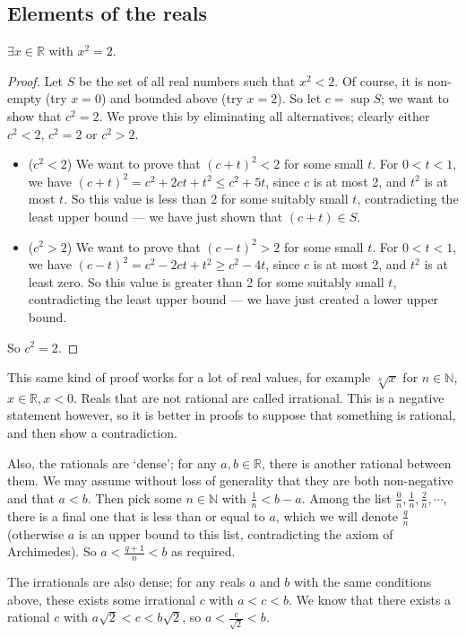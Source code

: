 \subsection{Elements of the reals}
\begin{theorem}
	\(\exists x \in \mathbb R\) with \(x^2 = 2\).
\end{theorem}
\begin{proof}
	Let \(S\) be the set of all real numbers such that \(x^2 < 2\).
	Of course, it is non-empty (try \(x=0\)) and bounded above (try \(x=2\)).
	So let \(c = \sup S\); we want to show that \(c^2 = 2\).
	We prove this by eliminating all alternatives; clearly either \(c^2 < 2\), \(c^2 = 2\) or \(c^2 > 2\).
	\begin{itemize}
		\item (\(c^2 < 2\)) We want to prove that \((c+t)^2 < 2\) for some small \(t\).
		      For \(0<t<1\), we have \((c+t)^2 = c^2 + 2ct + t^2 \leq c^2 + 5t\), since \(c\) is at most 2, and \(t^2\) is at most \(t\).
		      So this value is less than 2 for some suitably small \(t\), contradicting the least upper bound --- we have just shown that \((c+t) \in S\).
		\item (\(c^2 > 2\)) We want to prove that \((c-t)^2 > 2\) for some small \(t\).
		      For \(0<t<1\), we have \((c-t)^2 = c^2 - 2ct + t^2 \geq c^2 - 4t\), since \(c\) is at most 2, and \(t^2\) is at least zero.
		      So this value is greater than 2 for some suitably small \(t\), contradicting the least upper bound --- we have just created a lower upper bound.
	\end{itemize}
	So \(c^2 = 2\).
\end{proof}
This same kind of proof works for a lot of real values, for example \(\sqrt[n]{x}\) for \(n \in \mathbb N\), \(x\in \mathbb R, x < 0\).
Reals that are not rational are called irrational.
This is a negative statement however, so it is better in proofs to suppose that something is rational, and then show a contradiction.

Also, the rationals are `dense'; for any \(a, b \in \mathbb R\), there is another rational between them.
We may assume without loss of generality that they are both non-negative and that \(a<b\).
Then pick some \(n \in \mathbb N\) with \(\frac{1}{n} < b-a\).
Among the list \(\frac{0}{n}, \frac{1}{n}, \frac{2}{n}, \cdots\), there is a final one that is less than or equal to \(a\), which we will denote \(\frac{q}{n}\) (otherwise \(a\) is an upper bound to this list, contradicting the axiom of Archimedes).
So \(a < \frac{q + 1}{n} < b\) as required.

The irrationals are also dense; for any reals \(a\) and \(b\) with the same conditions above, these exists some irrational \(c\) with \(a<c<b\).
We know that there exists a rational \(c\) with \(a\sqrt{2} < c < b\sqrt{2}\), so \(a < \frac{c}{\sqrt{2}} < b\).
